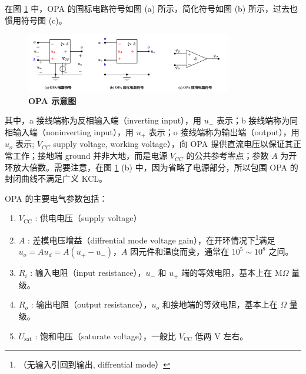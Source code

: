 \documentclass[UTF8]{report}
\theoremstyle{MyLineTheoremStyle} %
\theoremstyle{MyBlockTheoremStyle} %
\theoremstyle{MySubsubsectionStyle} %
\begin{document}
在图 \ref{OPA 示意图} 中，OPA 的国标电路符号如图 (a) 所示，简化符号如图 (b) 所示，过去也惯用符号图 (c)。
\begin{figure}[H]\centering
\includegraphics[width=0.8\textwidth]{assets/1,2/OPA运放.drawio.pdf}
\caption{\textbf{OPA 示意图}}\label{OPA 示意图}
\end{figure}

其中，a 接线端称为反相输入端（inverting input），用 $u_-$ 表示；b 接线端称为同相输入端（noninverting input），用 $u_+$ 表示；o 接线端称为输出端（output），用 $u_o$ 表示; $V_{CC}$ supply voltage, working voltage），向 OPA 提供直流电压以保证其正常工作；接地端 ground 并非大地，而是电源 $V_{CC}$ 的公共参考零点；参数 $A$ 为开环放大倍数。需要注意，在图 \ref{OPA 示意图} (b) 中，因为省略了电源部分，所以包围 OPA 的封闭曲线不满足广义 KCL。

OPA 的主要电气参数包括：
\begin{enumerate}
\item $V_\text{CC}$ : 供电电压（supply voltage）
\item $A$ : 差模电压增益（diffrential mode voltage gain），在开环情况下\footnote{（无输入引回到输出, diffrential mode）}满足 $u_o = Au_d = A(u_+-u_-) $，$A$ 因元件和温度而变，通常在 $10^5\sim 10^8$ 之间。
\item $R_i$ : 输入电阻（input resistance），$u_-$ 和 $u_+$ 端的等效电阻，基本上在 $\mathrm{M} \Omega$ 量级。
\item $R_o$ : 输出电阻（output resistance），$u_o$ 和接地端的等效电阻，基本上在 $\Omega$ 量级。
\item $U_{\text{sat}}$ : 饱和电压（saturate voltage），一般比 $V_{\text{CC}}$ 低两 $\mathrm{V}$ 左右。
\end{enumerate}
\end{document}
